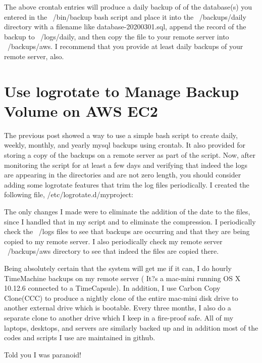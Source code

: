 \documentclass[final,letterpaper,12pt]{article}
\begin{document}
\noindent The above crontab entries will produce a daily backup of of the database(s) you entered in the ~/bin/backup bash script and place it into the ~/backups/daily directory with a filename like 
database-20200301.sql, append the record of the backup to ~/logs/daily, and then copy the file to your remote server into ~/backups/aws. I recommend that you provide at least daily backups of your remote server, also.

\section{Use logrotate to Manage Backup Volume on AWS EC2}
\noindent The previous post showed a way to use a simple bash script to create daily, weekly, monthly, and yearly mysql backups using crontab. It also provided for storing a copy of the backups on a remote server as part of the script. Now, after monitoring the script for at least a few days and verifying that indeed the logs are appearing in the directories and are not zero length, you should consider adding some logrotate features that trim the log files periodically. I created the following file, /etc/logrotate.d/myproject:




\noindent The only changes I made were to eliminate the addition of the date to the files, since I handled that in my script and to eliminate the compression. I periodically check the ~/logs files to see that backups are occurring and that they are being copied to my remote server. I also periodically check my remote server ~/backups/aws directory to see that indeed the files are copied there.

Being absolutely certain that the system will get me if it can, I do hourly TimeMachine backups on my remote server ( It?s a mac-mini running
OS X 10.12.6 connected to a TimeCapsule). In addition, I use Carbon Copy Clone(CCC) to produce a nightly clone of the entire mac-mini disk drive to another external drive which is bootable. Every three months, I also do a separate clone to another drive which I keep in a fire-proof safe. All of my laptops, desktops, and servers are similarly backed up and in addition most of the codes and scripts I use are maintained in github. 

\noindent Told you I was paranoid!
\end{document}

